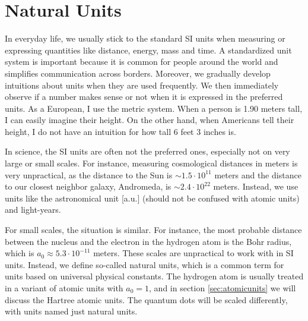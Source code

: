 \chapter{Natural Units} \label{app:units}
In everyday life, we usually stick to the standard SI units when measuring or expressing quantities like distance, energy, mass and time. A standardized unit system is important because it is common for people around the world and simplifies communication across borders. Moreover, we gradually develop intuitions about units when they are used frequently. We then immediately observe if a number makes sense or not when it is expressed in the preferred units. As a European, I use the metric system. When a person is 1.90 meters tall, I can easily imagine their height. On the other hand, when Americans tell their height, I do not have an intuition for how tall 6 feet 3 inches is. 

In science, the SI units are often not the preferred ones, especially not on very large or small scales. For instance, measuring cosmological distances in meters is very unpractical, as the distance to the Sun is $\sim1.5\cdot10^{11}$ meters and the distance to our closest neighbor galaxy, Andromeda, is $\sim 2.4\cdot10^{22}$ meters. Instead, we use units like the astronomical unit [a.u.] (should not be confused with atomic units) and light-years. 

For small scales, the situation is similar. For instance, the most probable distance between the nucleus and the electron in the hydrogen atom is the Bohr radius, which is $a_0\approx5.3\cdot10^{-11}$ meters. These scales are unpractical to work with in SI units. Instead, we define so-called natural units, which is a common term for units based on universal physical constants. The hydrogen atom is usually treated in a variant of atomic units with $a_0=1$, and in section \ref{sec:atomicunits} we will discuss the Hartree atomic units. The quantum dots will be scaled differently, with units named just natural units.

